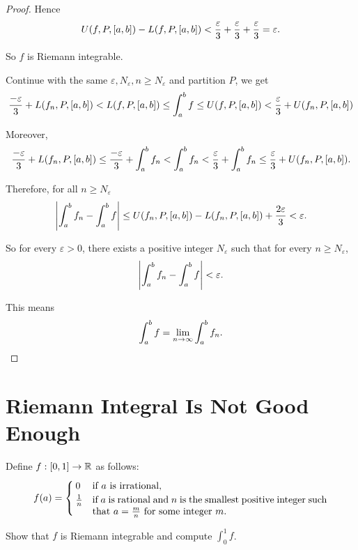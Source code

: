 \begin{proof}
    Hence
    \[
        U(f, P, \left[{a, b}\right]) - L(f, P, \left[{a, b}\right]) < \frac{\varepsilon}{3} + \frac{\varepsilon}{3} + \frac{\varepsilon}{3} = \varepsilon.
    \]

    So $f$ is Riemann integrable.

    Continue with the same $\varepsilon, N_{\varepsilon}, n\geq N_{\varepsilon}$ and partition $P$, we get
    \[
        \frac{-\varepsilon}{3} + L(f_{n}, P, \left[{a, b}\right]) < L(f, P, \left[{a, b}\right]) \leq \int^{b}_{a}f \leq U(f, P, \left[{a, b}\right]) < \frac{\varepsilon}{3} + U(f_{n}, P, \left[{a, b}\right])
    \]

    Moreover,
    \[
        \frac{-\varepsilon}{3} + L(f_{n}, P, \left[{a, b}\right]) \leq \frac{-\varepsilon}{3} + \int^{b}_{a}f_{n} < \int^{b}_{a}f_{n} < \frac{\varepsilon}{3} + \int^{b}_{a}f_{n} \leq \frac{\varepsilon}{3} + U(f_{n}, P, \left[{a, b}\right]).
    \]

    Therefore, for all $n\geq N_{\varepsilon}$
    \[
        \left\vert{\int^{b}_{a}f_{n} - \int^{b}_{a}f}\right\vert \leq U(f_{n}, P, \left[{a, b}\right]) - L(f_{n}, P, \left[{a, b}\right]) + \frac{2\varepsilon}{3} < \varepsilon.
    \]

    So for every $\varepsilon > 0$, there exists a positive integer $N_{\varepsilon}$ such that for every $n\geq N_{\varepsilon}$,
    \[
        \left\vert{\int^{b}_{a}f_{n} - \int^{b}_{a}f}\right\vert < \varepsilon.
    \]

    This means
    \[
        \int^{b}_{a}f = \lim\limits_{n\to\infty}\int^{b}_{a}f_{n}.\qedhere
    \]
\end{proof}
\newpage

\section{Riemann Integral Is Not Good Enough}

\begin{exercise}\label{chapter1:sectionB:exercise1}
    Define $f: \left[{0, 1}\right]\to \mathbb{R}$ as follows:
    \[
        f(a) = \begin{cases}
            0           & \text{if $a$ is irrational},                                                                                                             \\
            \frac{1}{n} & \parbox[t]{0.7\textwidth}{if $a$ is rational and $n$ is the smallest positive integer such that $a = \frac{m}{n}$ for some integer $m$.}
        \end{cases}
    \]

    Show that $f$ is Riemann integrable and compute $\int^{1}_{0}f$.
\end{exercise}

